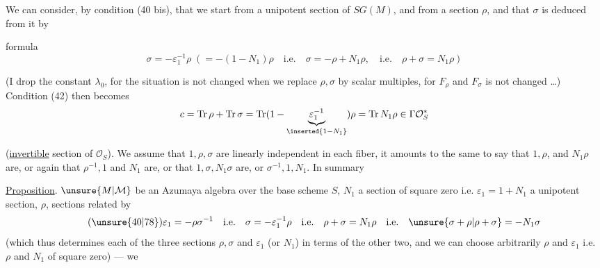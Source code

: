 \uline{} We can consider, by condition (40 bis), that we start from a unipotent section   of $SG(M)$, and from a section $\rho$, and that $\sigma$ is deduced from it by 


formula
\[
\tag{77}
\sigma=-\varepsilon_1^{-1}\rho\;\left(=-(1-N_1)\rho\quad\mathrm{i.e.}\quad\sigma=-\rho+N_1\rho,\quad\mathrm{i.e.}\quad\rho+\sigma=N_1\rho\right)
\]


(I drop the constant  $\lambda_0$, for  the situation is not changed when we replace $\rho,\sigma$ by scalar multiples, for $F_\rho$ and $F_\sigma$ is not changed \ldots) Condition (42) then becomes
\[
c=\operatorname{Tr}\rho+\operatorname{Tr}\sigma=\operatorname{Tr}(1-\underbrace{\varepsilon_1^{-1}}_{\inserted{1-N_1}})\rho=\operatorname{Tr}N_1\rho\in\Gamma\mathcal O_S^*
\]


(\uline{invertible} section of $\mathcal O_S$). We assume that $1,\rho,\sigma$ are linearly independent in each fiber, it amounts to the same to say that $1,\rho$, and $N_1\rho$ are, or again that $\rho^{-1},1$ and $N_1$ are, or that $1,\sigma,N_1\sigma$ are, or $\sigma^{-1},1,N_1$. In summary


\uline{Proposition}.  $\unsure{M|\mathcal M}$ be an Azumaya algebra over the base scheme $S$, $N_1$ a section of square zero  i.e. $\varepsilon_1=1+N_1$ a unipotent section, $\rho$, \inserted{$\sigma$}   sections related by
\[
\tag{\unsure{40|78}}
\varepsilon_1=-\rho\sigma^{-1}\quad\mathrm{i.e.}\quad\sigma=-\varepsilon_1^{-1}\rho\quad\mathrm{i.e.}\quad\rho+\sigma=N_1\rho\quad\mathrm{i.e.}\quad\unsure{\sigma+\rho|\rho+\sigma}=-N_1\sigma
\]
 (which thus determines each of the three sections  $\rho,\sigma$ and $\varepsilon_1$ (or $N_1$) in terms of the other two, and we can choose arbitrarily $\rho$ and  $\varepsilon_1$ i.e. $\rho$ and $N_1$ of square zero) --- we